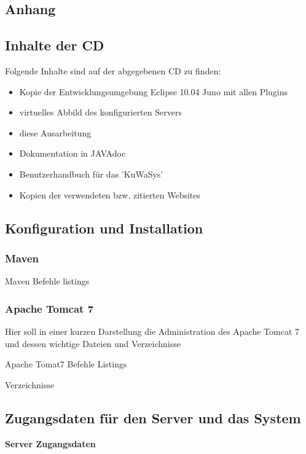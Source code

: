 \documentclass[12pt, twoside, a4paper, ngerman]{article}
\begin{document}
\begin{appendix}
\section{Anhang}\label{sec:Anhang}

\subsection{Inhalte der CD}
Folgende Inhalte sind auf der abgegebenen CD zu finden:

\begin{itemize}
  \item Kopie der Entwicklungsumgebung Eclipse 10.04 Juno mit allen Plugins
  \item virtuelles Abbild des konfigurierten Servers
  \item diese Ausarbeitung
  \item Dokumentation in JAVAdoc
  \item Benutzerhandbuch für das 'KuWaSys'
  \item Kopien der verwendeten bzw. zitierten Websites 
\end{itemize}

\subsection{Konfiguration und Installation}

\subsubsection{Maven}

Maven Befehle listings

\subsubsection{Apache Tomcat 7}

Hier soll in einer kurzen Darstellung die Administration des Apache Tomcat 7 und dessen wichtige Dateien und Verzeichnisse 

\textbf{}
Apache Tomat7 Befehle Listings

Verzeichnisse

\subsection{Zugangsdaten für den Server und das System}

\textbf{Server Zugangsdaten}


\end{appendix}
\end{document}
